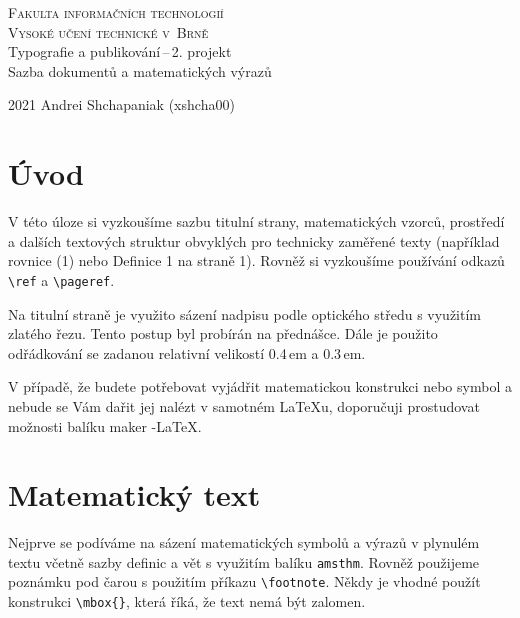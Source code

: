 \documentclass[a4paper, 11pt, twocolumn]{article}
\theoremstyle{definition}
\theoremstyle{plain}
\begin{document}
    \begin{titlepage}
        \begin{center}
            \Huge\textsc{Fakulta informačních technologií\\
            Vysoké učení technické v~Brně\\}
            \LARGE
            Typografie a publikování\,--\,2. projekt \\
            Sazba dokumentů a matematických výrazů
        \end{center}
        {\Large 2021 \hfill Andrei Shchapaniak (xshcha00)}
    \end{titlepage}

    \section*{Úvod}

    V této úloze si vyzkoušíme sazbu titulní strany, matematic\-kých vzorců,
    prostředí a dalších textových struktur obvyklých pro technicky zaměřené texty (například rovnice (1) nebo Definice 1 na straně 1).
    Rovněž si vyzkoušíme používání odkazů \verb;\ref; a \verb;\pageref;.

    Na titulní straně je využito sázení nadpisu podle optického středu s využitím zlatého řezu.
    Tento postup byl probírán na přednášce. Dále je použito odřádkování se zadanou relativní velikostí 0.4\,em a 0.3\,em.

    V případě, že budete potřebovat vyjádřit matematickou
    konstrukci nebo symbol a nebude se Vám dařit jej nalézt
    v samotném \LaTeX u, doporučuji prostudovat možnosti balíku maker \AmS -\LaTeX.

    \section{Matematický text}

    Nejprve se podíváme na sázení matematických symbolů
    a výrazů v plynulém textu včetně sazby definic a vět s využitím balíku \verb;amsthm;.
    Rovněž použijeme poznámku pod čarou s použitím příkazu \verb;\footnote;.
    Někdy je vhodné použít konstrukci \verb;\mbox{};, která říká, že text nemá být zalomen.
\end{document}
